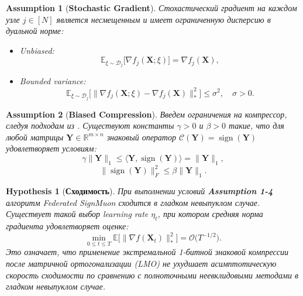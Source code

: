 \documentclass{article}
\newtheorem{assumption}{Assumption}
\newtheorem{hypothesis}{Hypothesis}
\begin{document}
\begin{assumption}[\textbf{Stochastic Gradient}]\label{as:3}
Стохастический градиент на каждом узле $j \in [N]$ является несмещенным и имеет ограниченную дисперсию в дуальной норме:
\begin{itemize}
    \item Unbiased: \begin{equation}
    \mathbb{E}_{\xi \sim \mathcal{D}_j}\bigl[\nabla f_j(\mathbf{X};\xi)\bigr] = \nabla f_j(\mathbf{X}),
    \end{equation}
    \item Bounded variance: \begin{equation}
    \mathbb{E}_{\xi \sim \mathcal{D}_j}\bigl[\|\nabla f_j(\mathbf{X};\xi) - \nabla f_j(\mathbf{X})\|_*^2\bigr] \le \sigma^2, \quad \sigma > 0.
    \end{equation}
\end{itemize}
\end{assumption}

\begin{assumption}[\textbf{Biased Compression}]\label{as:4} 
Введем ограничения на компрессор, следуя подходам из \cite{beznosikov2020biased}. Существуют константы $\gamma > 0$ и $\beta > 0$ такие, что для любой матрицы $\mathbf{Y} \in \mathbb{R}^{m \times n}$ знаковый оператор $\mathcal{C}(\mathbf{Y}) = \operatorname{sign}(\mathbf{Y})$ удовлетворяет условиям:
\begin{equation}
\gamma \|\mathbf{Y}\|_1 \le \langle \mathbf{Y}, \operatorname{sign}(\mathbf{Y}) \rangle = \|\mathbf{Y}\|_1,
\end{equation}
\begin{equation}
\|\operatorname{sign}(\mathbf{Y})\|_F^2 \le \beta \|\mathbf{Y}\|_1.
\end{equation}
\end{assumption}

\begin{hypothesis}[\textbf{Сходимость}]\label{hyp:1} 
При выполнении условий \textbf{Assumption 1-4} алгоритм Federated SignMuon сходится в гладком невыпуклом случае. Существует такой выбор learning rate $\eta_t$, при котором средняя норма градиента удовлетворяет оценке:
\begin{equation}
\min_{0 \le t \le T}\mathbb{E}\bigl[\|\nabla f(\mathbf{X}_t)\|_*^2\bigr] = \mathcal{O}\bigl(T^{-1/2}\bigr).
\end{equation}
Это означает, что применение экстремальной 1-битной знаковой компрессии после матричной ортогонализации (LMO) не ухудшает асимптотическую скорость сходимости по сравнению с полноточными неевклидовыми методами в гладком невыпуклом случае.
\end{hypothesis}
\end{document}
